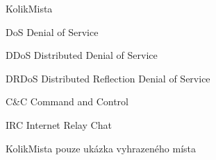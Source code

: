 \begin{seznamzkratek}{KolikMista}

		{DoS}
		{Denial of Service}
		
		{DDoS}
		{Distributed Denial of Service}
	
		{DRDoS}
		{Distributed Reflection Denial of Service}
	
		{C\&C} %
		{Command and Control}
		
		{IRC}
		{Internet Relay Chat}


		{KolikMista}
		{pouze ukázka vyhrazeného místa}

\end{seznamzkratek}
